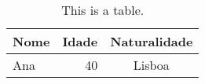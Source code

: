\documentclass[a4paper, 12pt]{report}
\begin{document}
\tableofcontents

\begin{table}
  \begin{tabular}{l | r | c}
    \textbf{Nome} & \textbf{Idade} & \textbf{Naturalidade} \\
    \hline
    Ana & 40 & Lisboa \\
  \end{tabular}
  \caption{This is a table.}  
\end{table}
\end{document}
